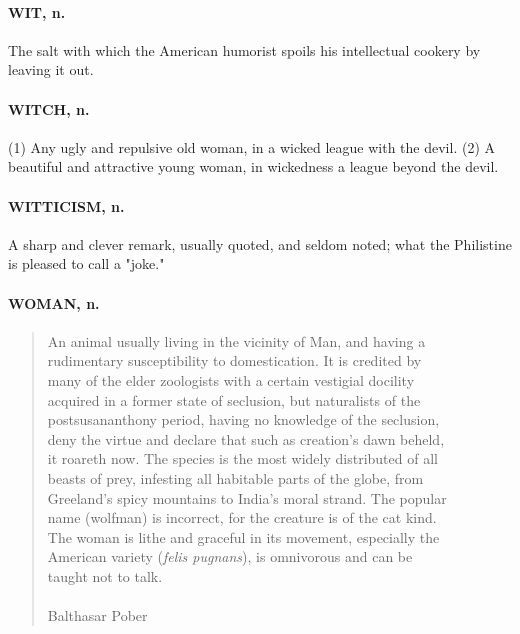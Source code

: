 \documentclass[11pt]{article}
\begin{document}
\paragraph{WIT, n.}  The salt with which the American humorist spoils his
intellectual cookery by leaving it out.

\paragraph{WITCH, n.}  (1)  Any ugly and repulsive old woman, in a wicked league
with the devil.  (2)  A beautiful and attractive young woman, in
wickedness a league beyond the devil.

\paragraph{WITTICISM, n.}  A sharp and clever remark, usually quoted, and seldom
noted; what the Philistine is pleased to call a "joke."

\paragraph{WOMAN, n.}

\begin{quote}       An animal usually living in the vicinity of Man, and having a \\
  rudimentary susceptibility to domestication.  It is credited by \\
  many of the elder zoologists with a certain vestigial docility \\
  acquired in a former state of seclusion, but naturalists of the \\
  postsusananthony period, having no knowledge of the seclusion, \\
  deny the virtue and declare that such as creation's dawn beheld, \\
  it roareth now.  The species is the most widely distributed of all \\
  beasts of prey, infesting all habitable parts of the globe, from \\
  Greeland's spicy mountains to India's moral strand.  The popular \\
  name (wolfman) is incorrect, for the creature is of the cat kind. \\
  The woman is lithe and graceful in its movement, especially the \\
  American variety ({\em felis pugnans}), is omnivorous and can be \\
  taught not to talk. \\
 \\
Balthasar Pober \end{quote}
\end{document}
